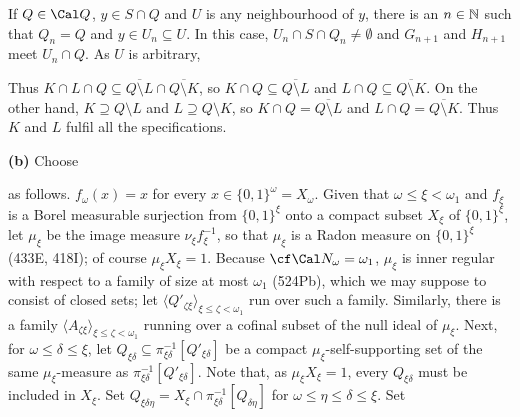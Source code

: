 {If $Q\in\Cal Q$, $y\in S\cap Q$ and $U$ is any neighbourhood
of $y$, there is an
$n\in\Bbb N$ such that $Q_n=Q$ and $y\in U_n\subseteq U$.   In this
case, $U_n\cap S\cap Q_n\ne\emptyset$ and $G_{n+1}$ and $H_{n+1}$ meet
$U_n\cap Q$.   As $U$ is arbitrary,


\noindent Thus $K\cap L\cap Q
\subseteq\overline{Q\setminus L}\cap\overline{Q\setminus K}$,
so $K\cap Q\subseteq\overline{Q\setminus L}$ and
$L\cap Q\subseteq\overline{Q\setminus K}$.
On the other hand, $K\supseteq Q\setminus L$ and $L\supseteq Q\setminus K$,
so $K\cap Q=\overline{Q\setminus L}$ and $L\cap Q=\overline{Q\setminus K}$.
Thus $K$ and $L$ fulfil all the specifications.\ \Qed


{\bf (b)} Choose



\noindent as follows.
$f_{\omega}(x)=x$ for every $x\in\{0,1\}^{\omega}=X_{\omega}$.
Given that $\omega\le\xi<\omega_1$ and
$f_{\xi}$ is a Borel measurable surjection from $\{0,1\}^{\xi}$ onto a
compact subset $X_{\xi}$ of $\{0,1\}^{\xi}$, let $\mu_{\xi}$ be
the image measure $\nu_{\xi}f_{\xi}^{-1}$, so that $\mu_{\xi}$ is a
Radon measure on $\{0,1\}^{\xi}$ (433E, 418I);  of course
$\mu_{\xi}X_{\xi}=1$.  Because $\cf\Cal N_{\omega}=\omega_1$,
$\mu_{\xi}$ is inner regular with respect to a family of size at most
$\omega_1$ (524Pb),
which we may suppose to consist of closed sets;  let
$\langle Q'_{\zeta\xi}\rangle_{\xi\le\zeta<\omega_1}$ run over such a
family.   Similarly, there is a family
$\langle A_{\zeta\xi}\rangle_{\xi\le\zeta<\omega_1}$ running over a
cofinal subset of the null ideal of $\mu_{\xi}$.
Next, for $\omega\le\delta\le\xi$, let
$Q_{\xi\delta}\subseteq\pi_{\xi\delta}^{-1}[Q'_{\xi\delta}]$ be a
compact
$\mu_{\xi}$-self-supporting set of the same $\mu_{\xi}$-measure as
$\pi_{\xi\delta}^{-1}[Q'_{\xi\delta}]$.
Note that, as $\mu_{\xi}X_{\xi}=1$, every $Q_{\xi\delta}$ must be
included in $X_{\xi}$.   Set
$Q_{\xi\delta\eta}=X_{\xi}\cap\pi_{\xi\delta}^{-1}[Q_{\delta\eta}]$
for $\omega\le\eta\le\delta\le\xi$.   Set

}

